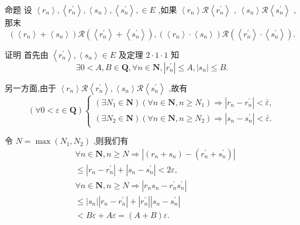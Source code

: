 命题 设 $\left\langle  {r}_{n}\right\rangle  ,\left\langle  {r}_{n}^{\prime }\right\rangle  ,\left\langle  {s}_{n}\right\rangle  ,\left\langle  {s}_{n}^{\prime }\right\rangle  , \in  E$ ,如果 $\left\langle  {r}_{n}\right\rangle  \mathcal{R}\left\langle  {r}_{n}^{\prime }\right\rangle$ , $\left\langle  {s}_{n}\right\rangle  \mathcal{R}\left\langle  {s}_{n}^{\prime }\right\rangle$ ,那末
$$\left( {\left\langle  {r}_{n}\right\rangle   + \left\langle  {s}_{n}\right\rangle  }\right) \mathcal{R}\left( {\left\langle  {r}_{n}^{\prime }\right\rangle   + \left\langle  {s}_{n}^{\prime }\right\rangle  }\right) ,\left( {\left\langle  {r}_{n}\right\rangle   \cdot  \left\langle  {s}_{n}\right\rangle  }\right) \mathcal{R}\left( {\left\langle  {r}_{n}^{\prime }\right\rangle   \cdot  \left\langle  {s}_{n}^{\prime }\right\rangle  }\right) .$$

证明 首先由 $\left\langle  {r}_{n}^{\prime }\right\rangle  ,\left\langle  {s}_{n}\right\rangle   \in  E$ 及定理 $2 \cdot  1 \cdot  1$ 知
$$\exists 0 < A,B \in  \mathbf{Q},\forall n \in  \mathbf{N},\left| {r}_{n}^{\prime }\right|  \leq  A,\left| {s}_{n}\right|  \leq  B.$$

另一方面,由于 $\left\langle  {r}_{n}\right\rangle  \mathcal{R}\left\langle  {r}_{n}^{\prime }\right\rangle  ,\left\langle  {s}_{n}\right\rangle  \mathcal{R}\left\langle  {s}_{n}^{\prime }\right\rangle$ ,故有
$$\left( {\forall 0 < \varepsilon  \in  \mathbf{Q}}\right) \left\{  \begin{array}{l} \left( {\exists {N}_{1} \in  \mathbf{N}}\right) \left( {\forall n \in  \mathbf{N},n \geq  {N}_{1}}\right)  \Rightarrow  \left| {{r}_{n} - {r}_{n}^{\prime }}\right|  < \bar{\varepsilon }, \\  \left( {\exists {N}_{2} \in  \mathbf{N}}\right) \left( {\forall n \in  \mathbf{N},n \geq  {N}_{2}}\right)  \Rightarrow  \left| {{s}_{n} - {s}_{n}^{\prime }}\right|  < \bar{\varepsilon }. \end{array}\right.$$

令 $N = \max \left( {{N}_{1},{N}_{2}}\right)$ ,则我们有
\begin{align*}
	&\forall n \in  \mathbf{N},n \geq  N \Rightarrow  \left| {\left( {{r}_{n} + {s}_{n}}\right)  - \left( {{r}_{n}^{\prime } + {s}_{n}^{\prime }}\right) }\right|\\
	&\leq  \left| {{r}_{n} - {r}_{n}^{\prime }}\right|  + \left| {{s}_{n} - {s}_{n}^{\prime }}\right|  < {2\varepsilon },\\
	&\forall n \in  \mathbf{N},n \geq  N \Rightarrow  \left| {{r}_{n}{s}_{n} - {r}_{n}^{\prime }{s}_{n}^{\prime }}\right|\\
	&\leq  \left| {s}_{n}\right| \left| {{r}_{n} - {r}_{n}^{\prime }}\right|  + \left| {r}_{n}^{\prime }\right| \left| {{s}_{n} - {s}_{n}^{\prime }}\right|\\
	&< {B\varepsilon } + {A\varepsilon } = \left( {A + B}\right) \varepsilon .
\end{align*}

